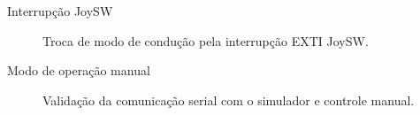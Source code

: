 \documentclass{if-beamer}
\begin{document}
\begin{frame}{Interrupção JoySW}
	
	\begin{figure}[H]
		\centering
		\caption{Troca de modo de condução pela interrupção EXTI JoySW.}
		\label{fig:TestJoySW}
	\end{figure}



\end{frame}


\begin{frame}{Modo de operação manual}
	
	\begin{figure}[H]
		\centering
		\caption{Validação da comunicação serial com o simulador e controle manual.}
		\label{fig:controle_manual}
	\end{figure}
	
	
\end{frame}
\end{document}
